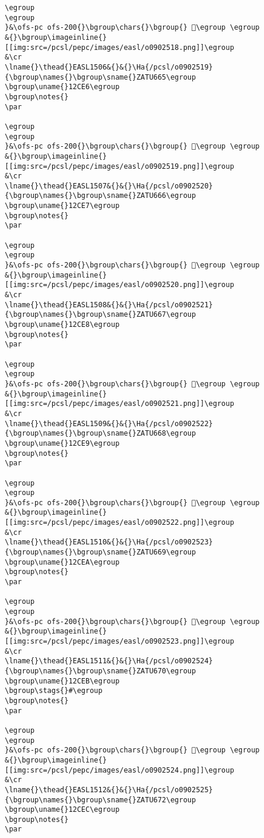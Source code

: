 \begin{verbatim}
\egroup
\egroup
}&\ofs-pc ofs-200{}\bgroup\chars{}\bgroup{} 𒳥\egroup \egroup
&{}\bgroup\imageinline{}[[img:src=/pcsl/pepc/images/easl/o0902518.png]]\egroup
&\cr
\lname{}\thead{}EASL1506&{}&{}\Ha{/pcsl/o0902519}{\bgroup\names{}\bgroup\sname{}ZATU665\egroup
\bgroup\uname{}12CE6\egroup
\bgroup\notes{}
\par 

\egroup
\egroup
}&\ofs-pc ofs-200{}\bgroup\chars{}\bgroup{} 𒳦\egroup \egroup
&{}\bgroup\imageinline{}[[img:src=/pcsl/pepc/images/easl/o0902519.png]]\egroup
&\cr
\lname{}\thead{}EASL1507&{}&{}\Ha{/pcsl/o0902520}{\bgroup\names{}\bgroup\sname{}ZATU666\egroup
\bgroup\uname{}12CE7\egroup
\bgroup\notes{}
\par 

\egroup
\egroup
}&\ofs-pc ofs-200{}\bgroup\chars{}\bgroup{} 𒳧\egroup \egroup
&{}\bgroup\imageinline{}[[img:src=/pcsl/pepc/images/easl/o0902520.png]]\egroup
&\cr
\lname{}\thead{}EASL1508&{}&{}\Ha{/pcsl/o0902521}{\bgroup\names{}\bgroup\sname{}ZATU667\egroup
\bgroup\uname{}12CE8\egroup
\bgroup\notes{}
\par 

\egroup
\egroup
}&\ofs-pc ofs-200{}\bgroup\chars{}\bgroup{} 𒳨\egroup \egroup
&{}\bgroup\imageinline{}[[img:src=/pcsl/pepc/images/easl/o0902521.png]]\egroup
&\cr
\lname{}\thead{}EASL1509&{}&{}\Ha{/pcsl/o0902522}{\bgroup\names{}\bgroup\sname{}ZATU668\egroup
\bgroup\uname{}12CE9\egroup
\bgroup\notes{}
\par 

\egroup
\egroup
}&\ofs-pc ofs-200{}\bgroup\chars{}\bgroup{} 𒳩\egroup \egroup
&{}\bgroup\imageinline{}[[img:src=/pcsl/pepc/images/easl/o0902522.png]]\egroup
&\cr
\lname{}\thead{}EASL1510&{}&{}\Ha{/pcsl/o0902523}{\bgroup\names{}\bgroup\sname{}ZATU669\egroup
\bgroup\uname{}12CEA\egroup
\bgroup\notes{}
\par 

\egroup
\egroup
}&\ofs-pc ofs-200{}\bgroup\chars{}\bgroup{} 𒳪\egroup \egroup
&{}\bgroup\imageinline{}[[img:src=/pcsl/pepc/images/easl/o0902523.png]]\egroup
&\cr
\lname{}\thead{}EASL1511&{}&{}\Ha{/pcsl/o0902524}{\bgroup\names{}\bgroup\sname{}ZATU670\egroup
\bgroup\uname{}12CEB\egroup
\bgroup\stags{}#\egroup
\bgroup\notes{}
\par 

\egroup
\egroup
}&\ofs-pc ofs-200{}\bgroup\chars{}\bgroup{} 𒳫\egroup \egroup
&{}\bgroup\imageinline{}[[img:src=/pcsl/pepc/images/easl/o0902524.png]]\egroup
&\cr
\lname{}\thead{}EASL1512&{}&{}\Ha{/pcsl/o0902525}{\bgroup\names{}\bgroup\sname{}ZATU672\egroup
\bgroup\uname{}12CEC\egroup
\bgroup\notes{}
\par 


\end{verbatim}

